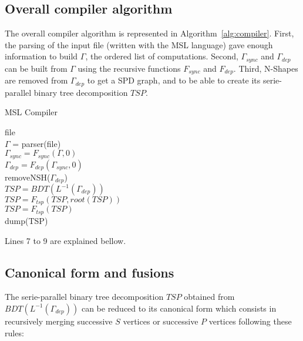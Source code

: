 \subsection{Overall compiler algorithm}

The overall compiler algorithm is represented in Algorithm~\ref{alg:compiler}. First, the parsing of the input file (written with the MSL language) gave enough information to build $\Gamma$, the ordered list of computations. Second, $\Gamma_{sync}$ and $\Gamma_{dep}$ can be built from $\Gamma$ using the recursive functions $F_{sync}$ and $F_{dep}$. Third, N-Shapes are removed from $\Gamma_{dep}$ to get a SPD graph, and to be able to create its serie-parallel binary tree decomposition $TSP$.

\begin{algorithm}
\caption{MSL Compiler}
\label{alg:compiler}
\begin{algorithmic}[1]
 {file}
\\$\Gamma$ = parser(file)
\\$\Gamma_{sync} = F_{sync}(\Gamma,0)$
\\$\Gamma_{dep} = F_{dep}(\Gamma_{sync},0)$
\\removeNSH($\Gamma_{dep}$)
\\$TSP = BDT(L^{-1}(\Gamma_{dep}))$
\\$TSP = F_{tsp}(TSP,root(TSP))$
\\$TSP = F_{tsp}(TSP)$
\EndIf
\\dump(TSP)
\EndProcedure
\end{algorithmic}
\end{algorithm}

Lines 7 to 9 are explained bellow.

\subsection{Canonical form and fusions}


The serie-parallel binary tree decomposition $TSP$ obtained from $BDT(L^{-1}(\Gamma_{dep}))$ can be reduced to its canonical form which consists in recursively merging successive $S$ vertices or successive $P$ vertices following these rules:

